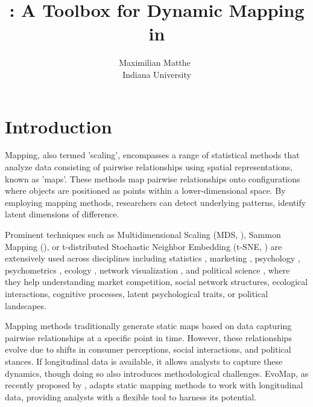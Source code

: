 \documentclass[article]{jss}
\author{Maximilian Matthe~\orcidlink{0000-0003-0918-3766}\\Indiana University}
\title{\proglang{evomap}: A Toolbox for Dynamic Mapping in \proglang{Python}}
\begin{document}


\section[Introduction]{Introduction} \label{sec:intro}

Mapping, also termed 'scaling', encompasses a range of statistical methods that analyze data 
consisting of pairwise relationships using spatial representations, known as 'maps'. 
These methods map pairwise relationships onto configurations where objects are positioned 
as points within a lower-dimensional space. By employing mapping methods, 
researchers can detect underlying patterns, identify latent dimensions of 
difference.

Prominent techniques such as Multidimensional Scaling (MDS, \cite{Carroll+Arabie:1998}), 
Sammon Mapping (\cite{Sammon:1969}), or t-distributed Stochastic Neighbor Embedding 
(t-SNE, \cite{van-der-Maaten+Hinton:2008}) are extensively used across disciplines including 
statistics \citep{Saeed+etal:2019}, marketing \citep{DeSarbo+Manrai+Manrai:1994}, 
psychology \citep{Goodwill+Alasdair+Meloy:2019}, 
psychometrics \citep{Hebart+Zheng+Pereira+Baker:2020}, 
ecology \citep{Kenkel+Orloci:1986}, 
network visualization \citep{Mane+Boerner:2004}, 
and political science \citep{Jacoby+Armstrong:2014}, where they help understanding 
market competition, social network structures, ecological interactions, cognitive processes, 
latent psychological traits, or political landscapes. 

Mapping methods traditionally generate static maps based on data capturing pairwise relationships 
at a specific point in time. However, these relationships evolve due to shifts in consumer perceptions, 
social interactions, and political stances. If longitudinal data is available, it 
allows analysts to capture these dynamics, though doing so also introduces methodological challenges. 
EvoMap, as recently proposed by \citep{Matthe+Ringel+Skiera:2023}, adapts static mapping methods 
to work with longitudinal data, providing analysts with a flexible tool to harness its potential.
\end{document}
